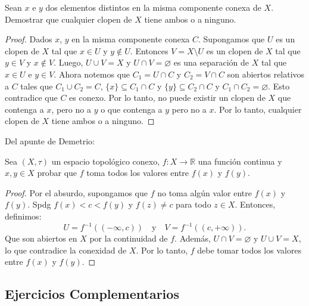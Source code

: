 \documentclass{article}
\theoremstyle{definition}
\newcommand{\R}{\mathbb{R}}
\newenvironment{ejercicio}[1]{\begin{trivlist}
\item[\hskip \labelsep {\bfseries Ejercicio}\hskip \labelsep {\bfseries #1.}]}{\end{trivlist}}
\begin{document}
\begin{ejercicio}{12}
    Sean \(x\) e \(y\) dos elementos distintos en la misma componente conexa de \(X\). Demostrar que cualquier clopen de \(X\) tiene ambos o a ninguno.
\end{ejercicio}
\begin{proof}
    Dados \( x \), \( y \) en la misma componente conexa \( C \). Supongamos que \( U \) es un clopen de \( X \) tal que \( x \in U \) y \( y \notin U \). Entonces \( V = X \setminus U \) es un clopen de \( X \) tal que
    \( y \in V \) y \( x \notin V \). Luego, \( U \cup V = X \) y \( U \cap V = \varnothing \) es una separación de \( X \) tal que \( x \in U \) e \( y \in V \).
    Ahora notemos que \( C_1 = U \cap C \) y \( C_2 = V \cap C \) son abiertos relativos a \( C \) tales que \( C_1 \cup C_2 = C \),
    \( \{ x \} \subseteq C_1 \cap C \) y \( \{ y \} \subseteq C_2 \cap C \) y \( C_1 \cap C_2 = \varnothing \). Esto contradice que \( C \) es conexo.
    Por lo tanto, no puede existir un clopen de \( X \) que contenga a \( x \), pero no a \( y \) o que contenga a \( y \) pero no a \( x \). Por lo tanto, cualquier clopen de \( X \) tiene ambos o a ninguno.
\end{proof}

Del apunte de Demetrio:

\begin{ejercicio}{13}
    Sea \( (X, \tau) \) un espacio topológico conexo, \( f : X \to \R \) una función continua y \( x, y \in X \) probar que \( f \) toma todos los valores entre \( f(x) \) y \( f(y) \).
\end{ejercicio}
\begin{proof}
    Por el absurdo, supongamos que \( f \) no toma algún valor entre \( f(x) \) y \( f(y) \). Spdg \( f(x) < c < f(y) \) y \( f(z) \neq c \) para todo \( z \in X \).
    Entonces, definimos: \[
        U = f^{-1}((-\infty, c)) \quad \text{y} \quad V = f^{-1}((c, +\infty)).
    \]
    Que son abiertos en \( X \) por la continuidad de \( f \). Además, \( U \cap V = \varnothing \) y \( U \cup V = X \), lo que contradice la conexidad de \( X \).
    Por lo tanto, \( f \) debe tomar todos los valores entre \( f(x) \) y \( f(y) \).
\end{proof}

\clearpage

\subsection*{Ejercicios Complementarios}
\end{document}
